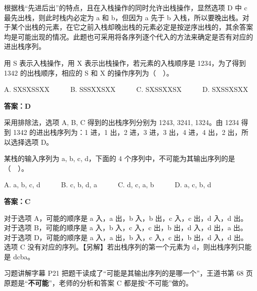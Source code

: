 \documentclass[10.5pt,a4paper,oneside]{article}
\newcommand{\hlred}[1]{\textcolor{wdred}{\bfseries #1}}
\begin{document}
\begin{jiexibox}

根据栈“先进后出”的特点，且在入栈操作的同时允许出栈操作，显然选项 D 中 c
最先出栈，则此时栈内必定为 a 和 b，但因为 a 先于 b
入栈，所以要晚出栈。对于某个出栈的元素，在它之前入栈却晚出栈的元素必定是按逆序出栈的，其余答案均是可能出现的情况。此题也可采用将各序列逐个代入的方法来确定是否有对应的进出栈序列。

\end{jiexibox}

\begin{questionbox}[16]

用 S 表示入栈操作，用 X 表示出栈操作，若元素的入栈顺序是 1234，为了得到
1342 的出栈顺序，相应的 S 和 X 的操作序列为（　）。

A. SXSXSSXX　　　B. SSSXXSXX　　　C. SXSSXXSX　　　D. SXSSXSXX

\end{questionbox}

\hlred{\textbf{答案：D}}

\begin{jiexibox}

采用排除法，选项 A, B, C 得到的出栈序列分别为 1243, 3241, 1324。由 1234
得到 1342 的进出栈序列为：1 进，1 出，2 进，3 进，3 出，4 进，4 出，2
出，所以选择选项 D。

\end{jiexibox}

\begin{questionbox}[19]

某栈的输入序列为 a, b, c, d，下面的 4
个序列中，不可能为其输出序列的是（　）。

A. a, b, c, d　　　B. c, b, d, a　　　C. d, c, a, b　　　D. a, c, b, d

\end{questionbox}

\hlred{\textbf{答案：C}}

\begin{jiexibox}

对于选项 A，可能的顺序是 a 入，a 出，b 入，b 出，c 入，c 出，d 入，d
出。对于选项 B，可能的顺序是 a 入，b 入，c 入，c 出，b 出，d 入，d 出，a
出。对于选项 D，可能的顺序是 a 入，a 出，b 入，c 入，c 出，b 出，d 入，d
出。选项 C 没有对应的序列。【另解】若出栈序列的第一个元素为
d，则出栈序列只能是 dcba。

\end{jiexibox}

\begin{fixbox}

习题讲解字幕 P21 把题干读成了“可能是其输出序列的是哪一个”，王道书第 68
页原题是“\textbf{不可能}”，老师的分析和答案 C 都是按“不可能”做的。

\end{fixbox}
\end{document}

